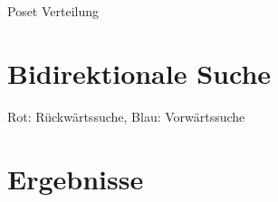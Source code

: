 \begin{frame}{Poset Verteilung}
  \begin{figure}[!b]
    \centering
    
  \end{figure}
\end{frame}


\section{Bidirektionale Suche}
\sectionframe{\insertsection}
\begin{frame}{\insertsection}
\end{frame}

\begin{frame}{\insertsection}
  \begin{figure}[!b]
    \centering
    
  \end{figure}

  {\color{red} Rot: Rückwärtssuche},
  {\color{blue} Blau: Vorwärtssuche}

\end{frame}


\section{Ergebnisse}
\sectionframe{\insertsection}

\begin{frame}{\insertsection}

\end{frame}

